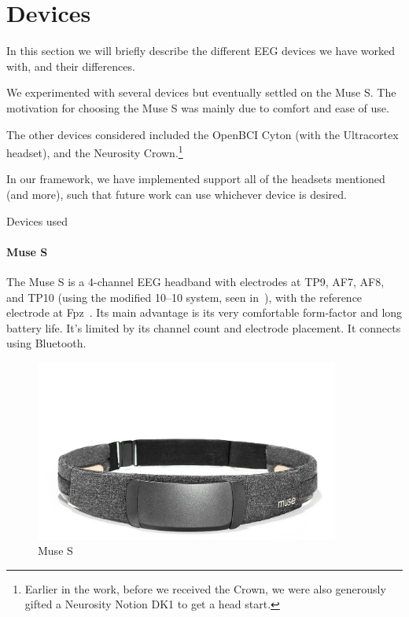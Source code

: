 \section{Devices}
    
    In this section we will briefly describe the different EEG devices we have worked with, and their differences.

    We experimented with several devices but eventually settled on the Muse S. The motivation for choosing the Muse S was mainly due to comfort and ease of use. 

    The other devices considered included the OpenBCI Cyton (with the Ultracortex headset), and the Neurosity Crown.\footnote{Earlier in the work, before we received the Crown, we were also generously gifted a Neurosity Notion DK1 to get a head start.} 

    In our framework, we have implemented support all of the headsets mentioned (and more), such that future work can use whichever device is desired.

    \vspace{0.5cm}
    \begin{table}[H]
        \centering
        
        \caption{Devices used}\label{table:devices}
    \end{table}
    \vspace{0.5cm}

    \begin{minipage}{\textwidth}
        \paragraph*{Muse S}
        The Muse S is a 4-channel EEG headband with electrodes at TP9, AF7, AF8, and TP10 (using the modified 10--10 system, seen in~), with the reference electrode at Fpz~\cite{krigolson_choosing_2017}. Its main advantage is its very comfortable form-factor and long battery life. It's limited by its channel count and electrode placement. It connects using Bluetooth.

        \begin{figure}[H]
            \centering
            \includegraphics[trim=0 0 0 200,clip,width=100mm]{img/Muse-S.jpg}
            \caption{Muse S}\label{fig:museS}
        \end{figure}
    \end{minipage}

